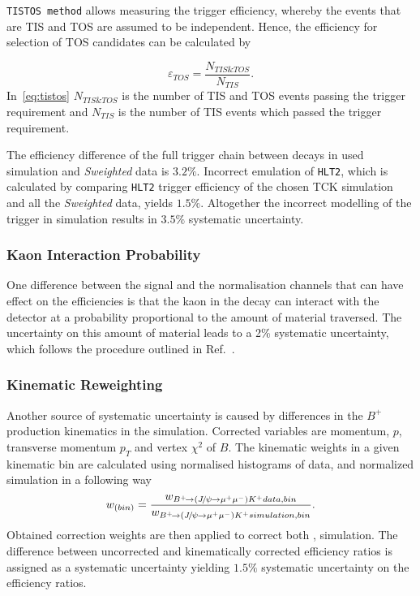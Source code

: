 \texttt{TISTOS method} allows measuring the trigger efficiency, whereby the events that are \gls{TIS} and \gls{TOS} are assumed to be independent. Hence, the efficiency
for selection of \gls{TOS} candidates can be calculated by

\begin{equation}
\varepsilon_{TOS} = \frac{N_{TIS\&TOS}}{N_{TIS}}.
\label{eq:tistos}
\end{equation}
In~\autoref{eq:tistos} $N_{TIS\&TOS}$ is the number of \gls{TIS} and \gls{TOS} events passing the trigger requirement and $N_{TIS}$ is the number of \gls{TIS} events which passed the trigger requirement.

The efficiency difference of the full trigger chain between \bjpsik decays in used simulation and \textit{Sweighted} data is $3.2\%$. Incorrect emulation of \texttt{HLT2}, which is calculated by comparing \texttt{HLT2} trigger efficiency of the chosen TCK simulation and all the \textit{Sweighted} data, yields $1.5\%$. Altogether the incorrect modelling of the trigger in simulation results in $3.5\%$ systematic uncertainty.

\subsubsection{Kaon Interaction Probability}
One difference between the signal and the normalisation channels that can have effect on the efficiencies is that the kaon in the decay \bjpsimumuk can interact with the detector at a probability proportional to the amount of material traversed. The uncertainty on this amount of material leads to a 2\% systematic
uncertainty, which follows the procedure outlined in Ref.~\cite{LHCb-DP-2013-002}.

\subsubsection{Kinematic Reweighting}
Another source of systematic uncertainty is caused by differences in the $B^{+}$ production kinematics in the simulation. Corrected variables are momentum, $p$, transverse momentum $p_{T}$ and vertex $\chi^{2}$ of $B$. The kinematic weights in a given kinematic bin are calculated using normalised histograms of \bjpsimumuk data, and normalized \bjpsimumuk simulation in a following way
\begin{equation}
w_{(bin)} =  \frac{w_{{{{B}^+}}\!\rightarrow ({{J\mskip -3mu/\mskip -2mu\psi\mskip 2mu}}\!\rightarrow {\ensuremath{\mu^+\mu^-}}){{K}^+} data,bin}}{w_{{{{B}^+}}\!\rightarrow ({{J\mskip -3mu/\mskip -2mu\psi\mskip 2mu}}\!\rightarrow {\ensuremath{\mu^+\mu^-}}){{K}^+} simulation,bin}}.
\end{equation}
Obtained correction weights are then applied to correct both \bjpsimumuk, \Bmumumu simulation. The difference between uncorrected and kinematically corrected efficiency ratios is assigned as a systematic uncertainty yielding $1.5\%$ systematic uncertainty on the efficiency ratios.


